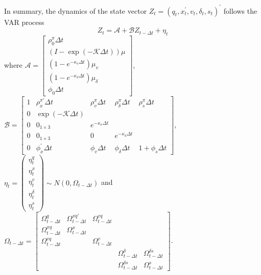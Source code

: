 \documentclass{article}
\begin{document}
In summary, the dynamics of the state vector $Z_{t}=\left(
q_{t},x_{t}^{\prime },v_{t},\delta _{t},s_{t}\right) ^{\prime }$ follows the
VAR process%
\begin{equation*}
Z_{t}=\mathcal{A}+\mathcal{B}Z_{t-\Delta t}+\eta _{t}
\end{equation*}%
where $\mathcal{A}=\left[ 
\begin{array}{c}
\rho _{0}^{\pi }\Delta t \\ 
\left( I-\exp \left( -\mathcal{K}\Delta t\right) \right) \mu \\ 
\left( 1-e^{-\kappa _{v}\Delta t}\right) \mu _{v} \\ 
\left( 1-e^{-\kappa _{\delta }\Delta t}\right) \mu _{\delta } \\ 
\phi _{0}\Delta t%
\end{array}%
\right] $, $\mathcal{B}=%
\begin{bmatrix}
1 & \rho _{x}^{\pi \prime }\Delta t & \rho _{v}^{\pi }\Delta t & \rho
_{\delta }^{\pi }\Delta t & \rho _{s}^{\pi }\Delta t \\ 
0 & \exp \left( -\mathcal{K}\Delta t\right) &  &  &  \\ 
0 & 0_{1\times 3} & e^{-\kappa _{v}\Delta t} &  &  \\ 
0 & 0_{1\times 3} & 0 & e^{-\kappa _{\delta }\Delta t} &  \\ 
0 & \phi _{x}^{\prime }\Delta t & \phi _{v}\Delta t & \phi _{\delta }\Delta t
& 1+\phi _{s}\Delta t%
\end{bmatrix}%
$, $\eta _{t}=\left( 
\begin{array}{c}
\eta _{t}^{q} \\ 
\eta _{t}^{x} \\ 
\eta _{t}^{v} \\ 
\eta _{t}^{\delta } \\ 
\eta _{t}^{s}%
\end{array}%
\right) \sim N\left( 0,\Omega _{t-\Delta t}\right) $ and $\Omega _{t-\Delta
t}=%
\begin{bmatrix}
\Omega _{t-\Delta t}^{q} & \Omega _{t-\Delta t}^{xq\prime } & \Omega
_{t-\Delta t}^{vq} &  &  \\ 
\Omega _{t-\Delta t}^{xq} & \Omega _{t-\Delta t}^{x} &  &  &  \\ 
\Omega _{t-\Delta t}^{vq} &  & \Omega _{t-\Delta t}^{v} &  &  \\ 
&  &  & \Omega _{t-\Delta t}^{\delta } & \Omega _{t-\Delta t}^{\delta s} \\ 
&  &  & \Omega _{t-\Delta t}^{\delta s} & \Omega _{t-\Delta t}^{s}%
\end{bmatrix}%
$.

\bigskip

\bigskip
\end{document}
